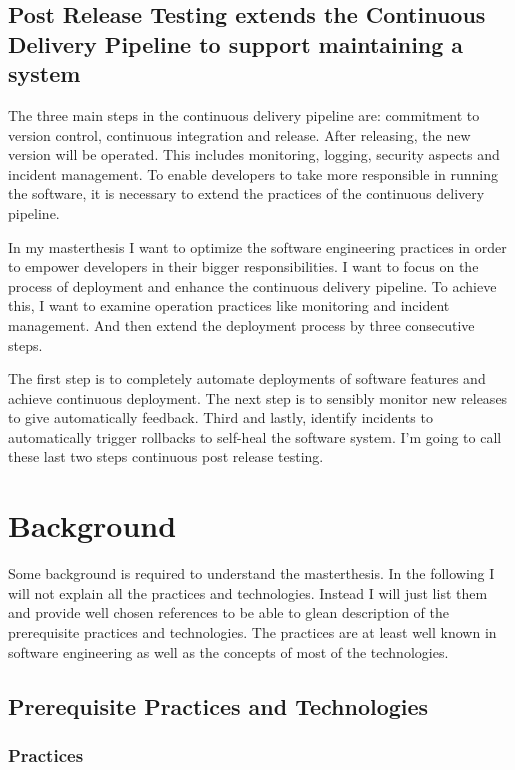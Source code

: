 \section{Post Release Testing extends the Continuous Delivery Pipeline to support
maintaining a system}

The three main steps in the continuous delivery pipeline are: commitment to version
control, continuous integration and release. After releasing, the new version will be
operated. This includes monitoring, logging, security aspects and incident
management\cite{sre_monitoring}. To enable developers to take more responsible in running
the software, it is necessary to extend the practices of the continuous delivery pipeline.

In my masterthesis I want to optimize the software engineering practices in order to
empower developers in their bigger responsibilities. I want to focus on the process of
deployment and enhance the continuous delivery pipeline. To achieve this, I want to
examine operation practices like monitoring and incident management. And then extend the
deployment process by three consecutive steps.

The first step is to completely automate deployments of software features and achieve
continuous deployment. The next step is to sensibly monitor new releases to give
automatically feedback. Third and lastly, identify incidents to automatically trigger
rollbacks to self-heal the software system. I'm going to call these last two steps
continuous post release testing.


\chapter{Background}

Some background is required to understand the masterthesis. In the following I will not
explain all the practices and technologies. Instead I will just list them and provide well
chosen references to be able to glean description of the prerequisite practices and
technologies. The practices are at least well known in software engineering as well as the
concepts of most of the technologies.

\section{Prerequisite Practices and Technologies}

\subsection{Practices}

